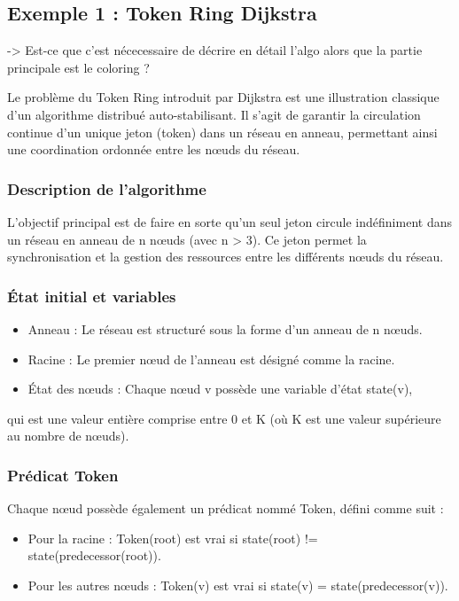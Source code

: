 \documentclass[11pt]{article}
\begin{document}
\subsection{Exemple 1 : Token Ring Dijkstra}
\label{sec:org693f0ec}

-> Est-ce que c'est nécecessaire de décrire en détail l'algo alors que la partie principale est le coloring ?  

Le problème du Token Ring introduit par Dijkstra est une illustration classique d'un algorithme distribué auto-stabilisant. 
Il s'agit de garantir la circulation continue d'un unique jeton (token) dans un réseau en anneau, permettant ainsi une coordination ordonnée entre les nœuds du réseau.

\subsubsection{Description de l'algorithme}
\label{sec:org693669a}

L'objectif principal est de faire en sorte qu'un seul jeton circule indéfiniment dans un réseau en anneau de n nœuds (avec n > 3). 
Ce jeton permet la synchronisation et la gestion des ressources entre les différents nœuds du réseau.

\subsubsection{État initial et variables}
\label{sec:org7edb391}
\begin{itemize}
\item Anneau : Le réseau est structuré sous la forme d'un anneau de n nœuds.
\item Racine : Le premier nœud de l'anneau est désigné comme la racine.
\item État des nœuds : Chaque nœud v possède une variable d'état state(v),
\end{itemize}
qui est une valeur entière comprise entre 0 et K (où K est une valeur supérieure au nombre de nœuds).

\subsubsection{Prédicat Token}
\label{sec:orga9b0f69}
Chaque nœud possède également un prédicat nommé Token, défini comme suit :
\begin{itemize}
\item Pour la racine : Token(root) est vrai si state(root) != state(predecessor(root)).
\item Pour les autres nœuds : Token(v) est vrai si state(v) = state(predecessor(v)).
\end{itemize}
\end{document}
